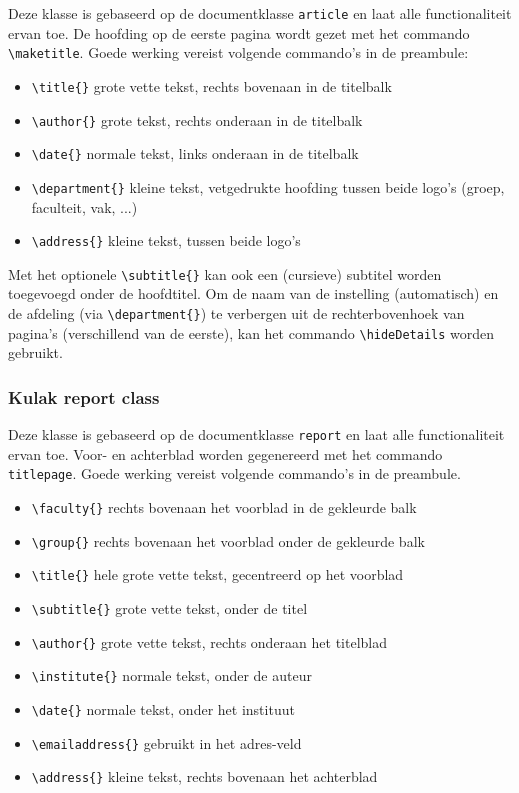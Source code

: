 \documentclass[kulak]{kulakarticle} %
\begin{document}
Deze klasse is gebaseerd op de documentklasse \texttt{article} en laat alle functionaliteit ervan toe. De hoofding op de eerste pagina wordt gezet met het commando \verb+\maketitle+.
Goede werking vereist volgende commando's in de preambule:
\begin{itemize}
	\item \verb+\title{}+ grote vette tekst, rechts bovenaan in de titelbalk
	\item \verb+\author{}+ grote tekst, rechts onderaan in de titelbalk
	\item \verb+\date{}+ normale tekst, links onderaan in de titelbalk
	\item \verb+\department{}+ kleine tekst, vetgedrukte hoofding tussen beide logo's (groep, faculteit, vak, ...)
	\item \verb+\address{}+ kleine tekst, tussen beide logo's
\end{itemize}
Met het optionele \verb+\subtitle{}+ kan ook een (cursieve) subtitel worden toegevoegd onder de hoofdtitel.
Om de naam van de instelling (automatisch) en de afdeling (via \verb+\department{}+) te verbergen uit de rechterbovenhoek van pagina's (verschillend van de eerste), kan het commando \verb+\hideDetails+ worden gebruikt.

\subsubsection{Kulak report class}

Deze klasse is gebaseerd op de documentklasse \texttt{report} en laat alle functionaliteit ervan toe. Voor- en achterblad worden gegenereerd met het commando \verb+titlepage+. Goede werking vereist volgende commando's in de preambule.

\begin{itemize}
	\item \verb+\faculty{}+ rechts bovenaan het voorblad in de gekleurde balk
	\item \verb+\group{}+ rechts bovenaan het voorblad onder de gekleurde balk
	\item \verb+\title{}+ hele grote vette tekst, gecentreerd op het voorblad
	\item \verb+\subtitle{}+ grote vette tekst, onder de titel
	\item \verb+\author{}+ grote vette tekst, rechts onderaan het titelblad
	\item \verb+\institute{}+ normale tekst, onder de auteur
	\item \verb+\date{}+ normale tekst, onder het instituut
	\item \verb+\emailaddress{}+ gebruikt in het adres-veld
	\item \verb+\address{}+ kleine tekst, rechts bovenaan het achterblad
\end{itemize}
\end{document}
